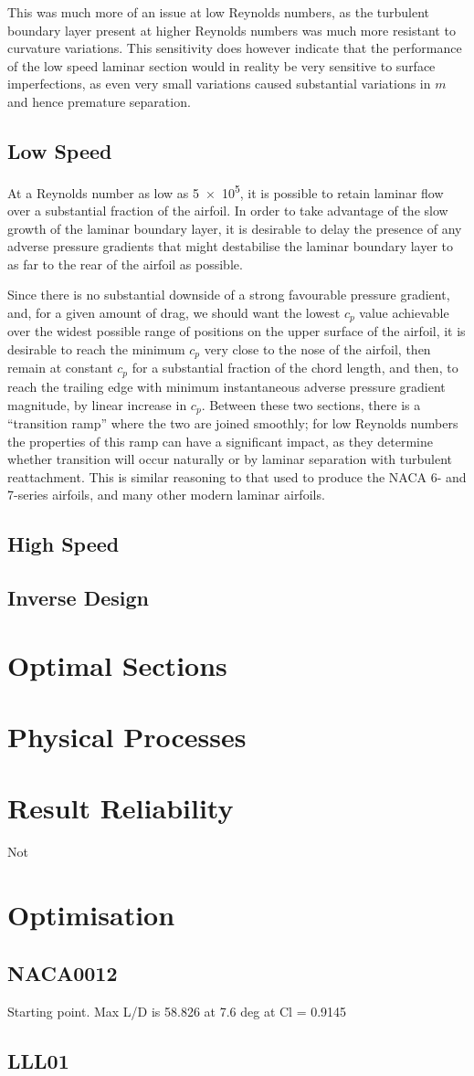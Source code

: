 \documentclass[12pt]{article}
\begin{document}
This was much more of an issue at low Reynolds numbers, as the turbulent boundary layer present at higher Reynolds numbers was much more resistant to curvature variations. This sensitivity does however indicate that the performance of the low speed laminar section would in reality be very sensitive to surface imperfections, as even very small variations caused substantial variations in $m$ and hence premature separation.
\subsection{Low Speed}
At a Reynolds number as low as \num{5e5}, it is possible to retain laminar flow over a substantial fraction of the airfoil. In order to take advantage of the slow growth of the laminar boundary layer, it is desirable to delay the presence of any adverse pressure gradients that might destabilise the laminar boundary layer to as far to the rear of the airfoil as possible.

Since there is no substantial downside of a strong favourable pressure gradient, and, for a given amount of drag, we should want the lowest $c_p$ value achievable over the widest possible range of positions on the upper surface of the airfoil, it is desirable to reach the minimum $c_p$ very close to the nose of the airfoil, then remain at constant $c_p$ for a substantial fraction of the chord length, and then, to reach the trailing edge with minimum instantaneous adverse pressure gradient magnitude, by linear increase in $c_p$. Between these two sections, there is a ``transition ramp'' where the two are joined smoothly; for low Reynolds numbers the properties of this ramp can have a significant impact, as they determine whether transition will occur naturally or by laminar separation with turbulent reattachment. This is similar reasoning to that used to produce the NACA 6- and 7-series airfoils, and many other modern laminar airfoils.
\subsection{High Speed}
\subsection{Inverse Design}
\section{Optimal Sections}
\section{Physical Processes}
\section{Result Reliability}
Not
\section{Optimisation}

\subsection{NACA0012}
Starting point. Max L/D is 58.826 at 7.6 deg at Cl = 0.9145
\subsection{LLL01}
\printbibliography
\end{document}
